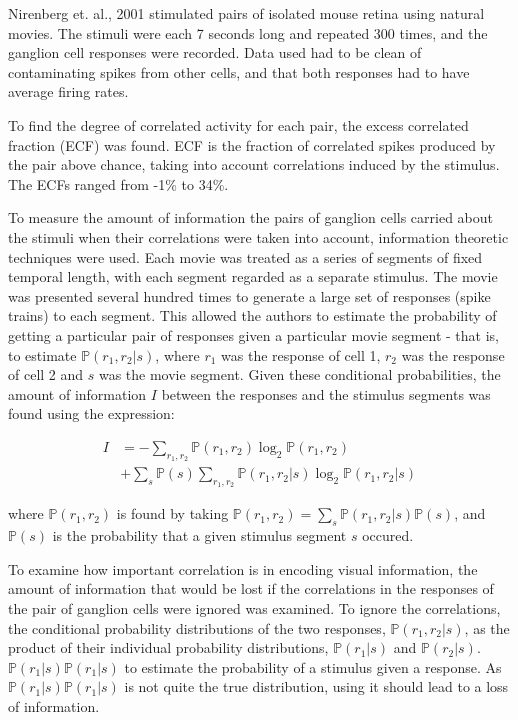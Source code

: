\documentclass[twoside]{article}
\begin{document}
\begin{multicols}{2}
\normalsize
Nirenberg et. al., 2001 stimulated pairs of isolated mouse retina using natural movies. The stimuli were each 7 seconds long and repeated 300 times, and the ganglion cell responses were recorded. Data used had to be clean of contaminating spikes from other cells, and that both responses had to have average firing rates. 

To find the degree of correlated activity for each pair, the excess correlated fraction (ECF) was found. ECF is the fraction of correlated spikes produced by the pair above chance, taking into account correlations induced by the stimulus. The ECFs ranged from -1\% to 34\%. 

To measure the amount of information the pairs of ganglion cells carried about the stimuli when their correlations were taken into account, information theoretic techniques were used. Each movie was treated as a series of segments of fixed temporal length, with each segment regarded as a separate stimulus. The movie was presented several hundred times to generate a large set of responses (spike trains) to each segment. This allowed the authors to estimate the probability of getting a particular pair of responses given a particular movie segment - that is, to estimate $\mathbb{P}(r_1,r_2|s)$, where $r_1$ was the response of cell 1, $r_2$ was the response of cell 2 and $s$ was the movie segment. Given these conditional probabilities, the amount of information $I$ between the responses and the stimulus segments was found using the expression:


\begin{align}\label{eq:info-theory}
	I 
		&= -\sum_{r_1,r_2}\mathbb{P}(r_1,r_2)\log_2\mathbb{P}(r_1,r_2) \\
  		&+ \sum_s\mathbb{P}(s) \sum_{r_1,r_2}\mathbb{P}(r_1,r_2|s)\log_2\mathbb{P}(r_1,r_2|s)
\end{align}


where $\mathbb{P}(r_1,r_2)$ is found by taking $\mathbb{P}(r_1,r_2) = \sum_s \mathbb{P}(r_1,r_2|s)\mathbb{P}(s)$, and $\mathbb{P}(s)$ is the probability that a given stimulus segment $s$ occured. 

To examine how important correlation is in encoding visual information, the amount of information that would be lost if the correlations in the responses of the pair of ganglion cells were ignored was examined. To ignore the correlations, the conditional probability distributions of the two responses, $\mathbb{P}(r_1,r_2|s)$, as the product of their individual probability distributions, $\mathbb{P}(r_1|s)$ and $\mathbb{P}(r_2|s)$. $\mathbb{P}(r_1|s)\mathbb{P}(r_1|s)$ to estimate the probability of a stimulus given a response. As $\mathbb{P}(r_1|s)\mathbb{P}(r_1|s)$ is not quite the true distribution, using it should lead to a loss of information. 


\end{multicols}
\end{document}
